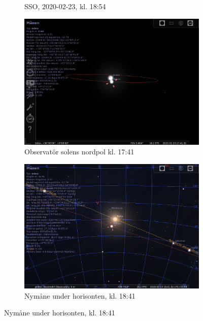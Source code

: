 \documentclass[./exercises.tex]{subfiles}
\begin{document}
\begin{itemize}
\begin{figure}[H]
\begin{subfigure}[b]{0.45\textwidth}
         \caption{SSO, 2020-02-23, kl. 18:54}
         \label{fig:y equals x}
     \end{subfigure}
     \hfill
     \begin{subfigure}[b]{0.45\textwidth}
         \centering
         \includegraphics[width=\textwidth]{Stellarium1/NewMoon/stellarium-001.png}
         \caption{Observatör solens nordpol kl. 17:41}
         \label{fig:three sin x}
     \end{subfigure}
     \hfill
     \begin{subfigure}[b]{0.45\textwidth}
         \centering
         \includegraphics[width=\textwidth]{Stellarium1/NewMoon/stellarium-002.png}
         \caption{Nymåne under horisonten, kl. 18:41}
         \label{fig:three sin x}
     \end{subfigure}

\end{figure}
\end{itemize}
\end{document}
